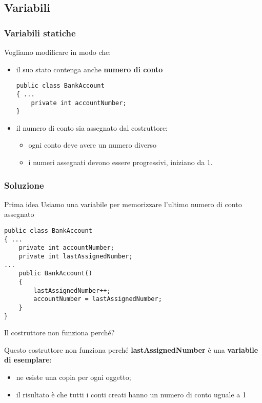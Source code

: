 \subsection*{Variabili}
\begin{frame}[fragile]
\frametitle{Variabili statiche}
\begin{block}{}
Vogliamo modificare \textbf{} in modo che:
\begin{itemize}
\item il suo stato contenga anche \textbf{\alert{numero di conto}}
\begin{lstlisting}
public class BankAccount
{ ...
    private int accountNumber;
}
\end{lstlisting}
\item il numero di conto sia assegnato dal costruttore:
\begin{itemize}
\item ogni conto deve avere un numero diverso
\item i numeri assegnati devono essere progressivi, iniziano da 1.
\end{itemize}
\end{itemize}
\end{block}
\end{frame}

\begin{frame}[fragile]
\frametitle{Soluzione}
\begin{block}{Prima idea}
Usiamo una variabile per memorizzare l'ultimo numero di conto assegnato
\end{block}
\begin{lstlisting}
public class BankAccount
{ ...
    private int accountNumber;
    private int lastAssignedNumber;
...
    public BankAccount()
    { 
        lastAssignedNumber++;
        accountNumber = lastAssignedNumber;
    }
}
\end{lstlisting}
\end{frame}

\begin{frame}
\begin{block}{}
Il costruttore non funziona perché?
\end{block}
\begin{block}{}
Questo costruttore non funziona perché \textbf{\alert{lastAssignedNumber}} è una \textbf{variabile di esemplare}:
\begin{itemize}
\item ne esiste una copia per ogni oggetto;
\item il risultato è che tutti i conti creati hanno un numero di conto uguale a 1
\end{itemize}
\end{block}
\end{frame}

